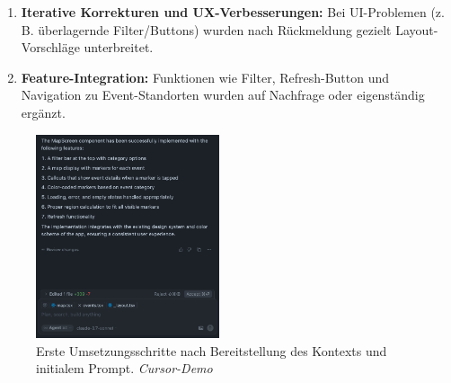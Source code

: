 \begin{enumerate}[resume]
      \item \textbf{Iterative Korrekturen und UX-Verbesserungen:} Bei UI-Problemen (z.\,B. überlagernde Filter/Buttons) wurden nach Rückmeldung gezielt Layout-Vorschläge unterbreitet.
      \item \textbf{Feature-Integration:} Funktionen wie Filter, Refresh-Button und Navigation zu Event-Standorten wurden auf Nachfrage oder eigenständig ergänzt.
\end{enumerate}

\begin{figure}[htbp]
      \centering
      \vspace{1em}
      \includegraphics[width=0.48\textwidth]{images/cursor_screenshots/erster durchgang-cursor.png}
      \caption{Erste Umsetzungsschritte nach Bereitstellung des Kontexts und initialem Prompt. \textit{Cursor-Demo}}
      \label{fig:cursor-erster-durchgang}
\end{figure}

